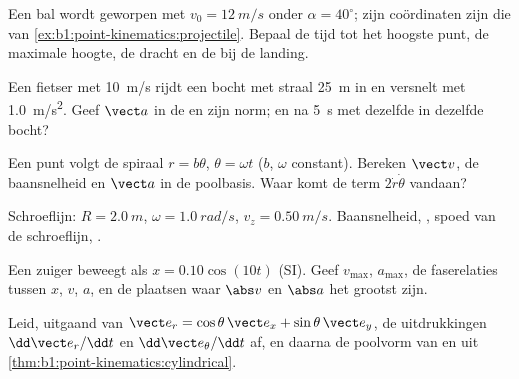 \begin{exercise}[$\star$]\label{exo:b1:point-kinematics:4}
Een bal wordt geworpen met $v_0 = \qty{12}{m/s}$ onder $\alpha = 40^\circ$; zijn
coördinaten zijn die van \cref{ex:b1:point-kinematics:projectile}.
Bepaal de tijd tot het hoogste punt, de maximale hoogte, de dracht en de
 bij de landing.
\end{exercise}

\begin{exercise}[$\star\star$]\label{exo:b1:point-kinematics:5}
Een fietser met \qty{10}{m/s} rijdt een bocht met straal \qty{25}{m} in en
versnelt met \qty{1.0}{m/s^2}. Geef $\vect a$ in de  en
zijn norm; en na \qty{5}{s} met dezelfde  in dezelfde bocht?
\end{exercise}

\begin{exercise}[$\star\star$]\label{exo:b1:point-kinematics:6}
Een punt volgt de spiraal $r = b\theta$, $\theta = \omega t$ ($b$,
$\omega$ constant). Bereken $\vect v$, de baansnelheid en $\vect a$ in de
poolbasis. Waar komt de term $2\dot r\dot\theta$ vandaan?
\end{exercise}

\begin{exercise}[$\star\star$]\label{exo:b1:point-kinematics:7}
Schroeflijn: $R = \qty{2.0}{m}$, $\omega = \qty{1.0}{rad/s}$, $v_z = \qty{0.50}{m/s}$.
Baansnelheid, , spoed van de schroeflijn, .
\end{exercise}

\begin{exercise}[$\star\star$]\label{exo:b1:point-kinematics:8}
Een zuiger beweegt als $x = 0.10\cos(10t)$ (SI). Geef $v_{\max}$, $a_{\max}$,
de faserelaties tussen $x$, $v$, $a$, en de plaatsen waar
$\abs v$ en $\abs a$ het grootst zijn.
\end{exercise}

\begin{exercise}[$\star\star$]\label{exo:b1:point-kinematics:9}
Leid, uitgaand van $\vect e_r = \cos\theta\,\vect e_x + \sin\theta\,\vect e_y$,
de uitdrukkingen $\dd\vect e_r/\dd t$ en $\dd\vect e_\theta/\dd t$ af, en daarna de
poolvorm van  en  uit \cref{thm:b1:point-kinematics:cylindrical}.
\end{exercise}

